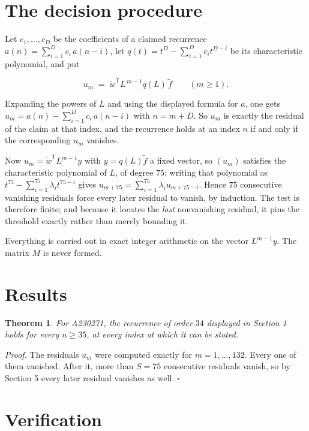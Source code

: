 \documentclass[11pt]{article}
\newtheorem{theorem}{Theorem}
\theoremstyle{definition}
\begin{document}
\section{The decision procedure}

Let $c_1,\dots,c_D$ be the coefficients of a claimed recurrence $a(n) = \sum_{i=1}^{D} c_i\,a(n-i)$, let $q(t) = t^{D} - \sum_{i=1}^{D} c_i t^{D-i}$ be its characteristic polynomial, and put

\[u_m \;=\; \tilde w^{\mathsf T} L^{\,m-1} q(L)\,\tilde f \qquad (m \ge 1).\]

Expanding the powers of $L$ and using the displayed formula for $a$, one gets $u_m = a(n) - \sum_{i=1}^{D} c_i\,a(n-i)$ with $n = m + D$. So $u_m$ is exactly the residual of the claim at that index, and the recurrence holds at an index $n$ if and only if the corresponding $u_m$ vanishes.

Now $u_m = \tilde w^{\mathsf T} L^{m-1} y$ with $y = q(L)\tilde f$ a fixed vector, so $(u_m)$ satisfies the characteristic polynomial of $L$, of degree $75$: writing that polynomial as $t^{75} - \sum_{i=1}^{75} \lambda_i t^{75-i}$ gives $u_{m+75} = \sum_{i=1}^{75} \lambda_i u_{m+75-i}$. Hence $75$ consecutive vanishing residuals force every later residual to vanish, by induction. The test is therefore finite; and because it locates the {\itshape last} nonvanishing residual, it pins the threshold exactly rather than merely bounding it.

Everything is carried out in exact integer arithmetic on the vector $L^{m-1}y$. The matrix $M$ is never formed.

\section{Results}

\begin{theorem} For A230271, the recurrence of order $34$ displayed in Section 1 holds for every $n \ge 35$, at every index at which it can be stated.\end{theorem}

{\itshape Proof.} The residuals $u_m$ were computed exactly for $m = 1,\dots,132$. Every one of them vanished. After it, more than $S = 75$ consecutive residuals vanish, so by Section 5 every later residual vanishes as well. $\square$

\section{Verification}
\end{document}

